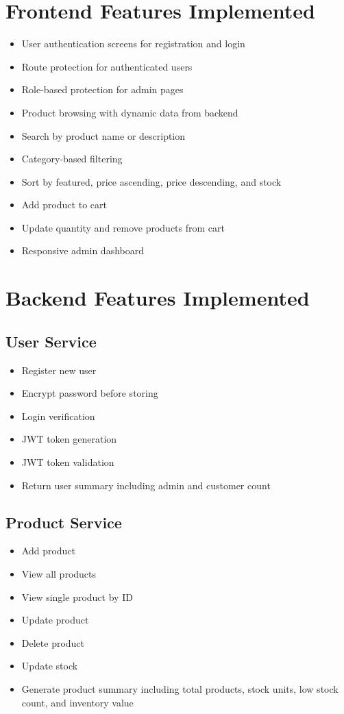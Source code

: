 \documentclass[12pt,a4paper]{article}
\begin{document}
\section{Frontend Features Implemented}
\begin{itemize}[leftmargin=1.5cm]
    \item User authentication screens for registration and login
    \item Route protection for authenticated users
    \item Role-based protection for admin pages
    \item Product browsing with dynamic data from backend
    \item Search by product name or description
    \item Category-based filtering
    \item Sort by featured, price ascending, price descending, and stock
    \item Add product to cart
    \item Update quantity and remove products from cart
    \item Responsive admin dashboard
\end{itemize}

\section{Backend Features Implemented}
\subsection{User Service}
\begin{itemize}[leftmargin=1.5cm]
    \item Register new user
    \item Encrypt password before storing
    \item Login verification
    \item JWT token generation
    \item JWT token validation
    \item Return user summary including admin and customer count
\end{itemize}

\subsection{Product Service}
\begin{itemize}[leftmargin=1.5cm]
    \item Add product
    \item View all products
    \item View single product by ID
    \item Update product
    \item Delete product
    \item Update stock
    \item Generate product summary including total products, stock units, low stock count, and inventory value
\end{itemize}
\end{document}
